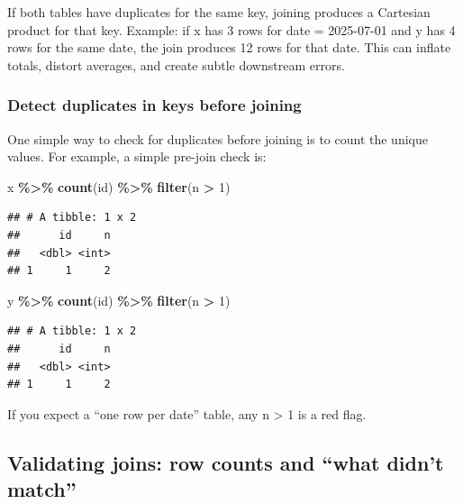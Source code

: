 \documentclass[
  11pt,
]{article}
\newenvironment{Shaded}{\begin{snugshade}}{\end{snugshade}}
\newcommand{\DecValTok}[1]{\textcolor[rgb]{0.00,0.00,0.81}{#1}}
\newcommand{\FunctionTok}[1]{\textcolor[rgb]{0.13,0.29,0.53}{\textbf{#1}}}
\newcommand{\NormalTok}[1]{#1}
\newcommand{\SpecialCharTok}[1]{\textcolor[rgb]{0.81,0.36,0.00}{\textbf{#1}}}
\begin{document}
If both tables have duplicates for the same key, joining produces a
Cartesian product for that key. Example: if x has 3 rows for date =
2025-07-01 and y has 4 rows for the same date, the join produces 12 rows
for that date. This can inflate totals, distort averages, and create
subtle downstream errors.

\subsubsection{Detect duplicates in keys before
joining}\label{detect-duplicates-in-keys-before-joining}

One simple way to check for duplicates before joining is to count the
unique values. For example, a simple pre-join check is:

\begin{Shaded}
\begin{Highlighting}[]
\NormalTok{x }\SpecialCharTok{\%\textgreater{}\%} \FunctionTok{count}\NormalTok{(id) }\SpecialCharTok{\%\textgreater{}\%} \FunctionTok{filter}\NormalTok{(n }\SpecialCharTok{\textgreater{}} \DecValTok{1}\NormalTok{)}
\end{Highlighting}
\end{Shaded}

\begin{verbatim}
## # A tibble: 1 x 2
##      id     n
##   <dbl> <int>
## 1     1     2
\end{verbatim}

\begin{Shaded}
\begin{Highlighting}[]
\NormalTok{y }\SpecialCharTok{\%\textgreater{}\%} \FunctionTok{count}\NormalTok{(id) }\SpecialCharTok{\%\textgreater{}\%} \FunctionTok{filter}\NormalTok{(n }\SpecialCharTok{\textgreater{}} \DecValTok{1}\NormalTok{)}
\end{Highlighting}
\end{Shaded}

\begin{verbatim}
## # A tibble: 1 x 2
##      id     n
##   <dbl> <int>
## 1     1     2
\end{verbatim}

If you expect a ``one row per date'' table, any n \textgreater{} 1 is a
red flag.

\subsection{Validating joins: row counts and ``what didn't
match''}\label{validating-joins-row-counts-and-what-didnt-match}
\end{document}
